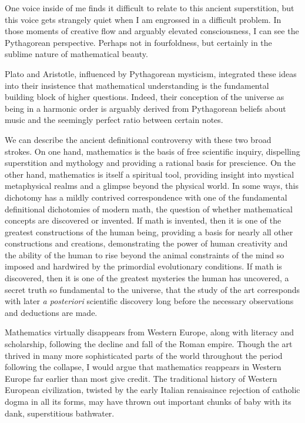 \documentclass[12pt]{article}
\begin{document}
One voice inside of me finds it difficult to relate
to this ancient superstition,
but this voice gets strangely quiet
when I am engrossed in a difficult problem.
In those moments of creative flow
and arguably elevated consciousness,
I can see the Pythagorean perspective.
Perhaps not in fourfoldness,
but certainly in the sublime nature of mathematical beauty.

Plato and Aristotle,
influenced by Pythagorean mysticism,
integrated these ideas
into their insistence that mathematical understanding 
is the fundamental building block of higher questions.
Indeed, their conception of the universe as
being in a harmonic order is arguably derived from
Pythagorean beliefs about music
and the seemingly perfect ratio between certain notes.

We can describe the ancient definitional controversy
with these two broad strokes.
On one hand, mathematics is the basis of free scientific inquiry,
dispelling superstition and mythology
and providing a rational basis for prescience.
On the other hand, mathematics is itself a spiritual tool,
providing insight into mystical metaphysical realms
and a glimpse beyond the physical world.
In some ways,
this dichotomy
has a mildly contrived correspondence with one of
the fundamental definitional dichotomies
of modern math,
the question of whether mathematical concepts
are discovered or invented.
If math is invented,
then it is one of the greatest constructions of the human being,
providing a basis for nearly all other constructions and creations,
demonstrating the power of human creativity
and the ability of the human to rise beyond the animal constraints of the mind
so imposed and hardwired by the primordial evolutionary conditions.
If math is discovered,
then it is one of the greatest mysteries the human has uncovered,
a secret truth so fundamental to the universe,
that the study of the art corresponds
with later \textit{a posteriori} scientific discovery
long before the necessary observations and deductions are made.

Mathematics virtually disappears from Western Europe,
along with literacy and scholarship,
following the decline and fall of the Roman empire.
Though the art thrived in many more sophisticated
parts of the world throughout the period
following the collapse,
I would argue that mathematics reappears in Western Europe
far earlier than most give credit.
The traditional history of Western European civilization,
twisted by the early Italian renaisaince rejection
of catholic dogma in all its forms,
may have thrown out important chunks of baby
with its dank, superstitious bathwater.
\end{document}
